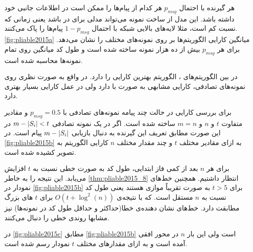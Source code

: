 هر گیرنده با احتمال
$p_{msg}$
هر کدام از پیام‌ها را ممکن است در اطلاعات جانبی خود داشته باشد. این مدل از ساخت نمونه می‌تواند مدلی برای
در
باشد یعنی زمانی که نسبت
کم است، مثلا لایه‌های بالایی شبکه با احتمال
$1 - p_{msg}$
پیام‌ها را پاک می‌کنند.
\autoref{fig:pliable2015a}
میانگین کارایی الگوریتم‌ها بر روی نمونه‌های مختلف را نشان می‌دهد. برای هر
$p_{msg}$
بیش از ده هزار نمونه ساخته شده است و طول کد میانگین روی تمام نمونه‌ها محاسبه شده است.

در بین الگوریتم‌های
\picods، الگوریتم
بهترین کارایی را دارد. در واقع
به صورت نظری روی نمونه‌های تصادفی، کارایی مشابهی به صورت
با
دارد ولی در عمل کارایی بسیار بهتری دارد.

برای بررسی کارایی
در حالت چند پیامه
نمونه‌های تصادفی با
$p_{msg} = 0.5$
و مقادیر متفاوت
$t$
و
$n$
و
$m = n$
ساخته شده است. اگر در یک نمونه‌ تصادفی
$m - \left|{S_i}\right| < t$
در این صورت مطابق تعریف این گیرنده به دنبال بازیابی
$m - \left|{S_i}\right|$
پیام است. در
\autoref{fig:pliable2015b}
به ازای مقادیر مختلف
$t$
و چند مقدار مختلف
$n$
کارایی الگوریتم به تصویر کشیده شده است.

برای هر
$n$
بعد از کمی فاز ابتدایی، طول کد به صورت خطی نسبت به
$t$
افزایش می‌یابد. این نتیجه را به خاطر
\autoref{thm:pliable2015_8}
انتظار داشتیم. همچنین خط‌های نمودار در
\autoref{fig:pliable2015b}
برای
$t > 5$
به صورت تقریباً موازی هستند یعنی طول کد نسبت به
$n$
مستقل است. که با نتیجه‌ی
$O(t + \log^2(n))$
برای
$t$
های بزرگ مطابقت دارد. خط‌های نشان دهنده‌ی خطا(حداکثر و حداقل طول کد در نمونه‌ها) نیز مشابها روندی خطی را دنبال می‌کنند.

در
\autoref{fig:pliable2015c}
مطابق
\autoref{fig:pliable2015b}
است ولی این بار
$n$
در محور افقی آمده است و به ازای مقدارهای مختلف
$t$
نمودار رسم شده است.

